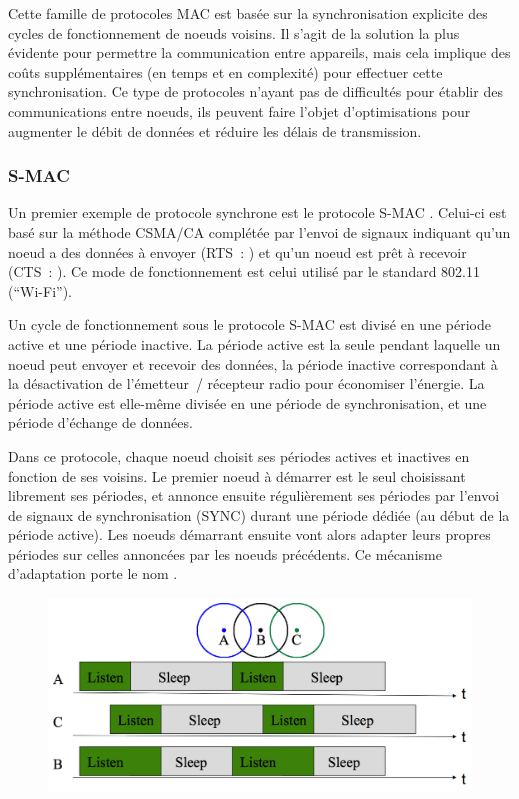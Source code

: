 Cette famille de protocoles MAC est basée sur la synchronisation explicite
des cycles de fonctionnement de noeuds voisins. Il s'agit de la solution
la plus évidente pour permettre la communication entre appareils, mais
cela implique des coûts supplémentaires (en temps et en complexité)
pour effectuer cette synchronisation. Ce type de protocoles n'ayant
pas de difficultés pour établir des communications entre noeuds,
ils peuvent faire l'objet d'optimisations pour augmenter le débit
de données et réduire les délais de transmission.

\subsubsection{S-MAC}
\label{ParSMAC}

Un premier exemple de protocole synchrone est le protocole S-MAC \cite{SMAC}.
Celui-ci est basé sur la méthode CSMA/CA complétée par l'envoi de signaux
indiquant qu'un noeud a des données à envoyer (RTS~: )
et qu'un noeud est prêt à recevoir (CTS~: ). Ce mode
de fonctionnement est celui utilisé par le standard 802.11 (``Wi-Fi'').

Un cycle de fonctionnement sous le protocole S-MAC est divisé en une
période active et une période inactive. La période active est la seule
pendant laquelle un noeud peut envoyer et recevoir des données, la période
inactive correspondant à la désactivation de l'émetteur~/ récepteur radio
pour économiser l'énergie. La période active est elle-même divisée en
une période de synchronisation, et une période d'échange de données.

Dans ce protocole, chaque noeud choisit ses périodes actives et inactives
en fonction de ses voisins. Le premier noeud à démarrer est le seul
choisissant librement ses périodes, et annonce ensuite régulièrement
ses périodes par l'envoi de signaux de synchronisation (SYNC) durant
une période dédiée (au début de la période active). Les noeuds démarrant
ensuite vont alors adapter leurs propres périodes sur celles annoncées
par les noeuds précédents. Ce mécanisme d'adaptation porte le nom
.

\begin{figure}[!hbt]
\centering
\includegraphics[width=12.5cm]{images/ch3-s-mac.png}
\label{FigSMACadapt}
\end{figure}

